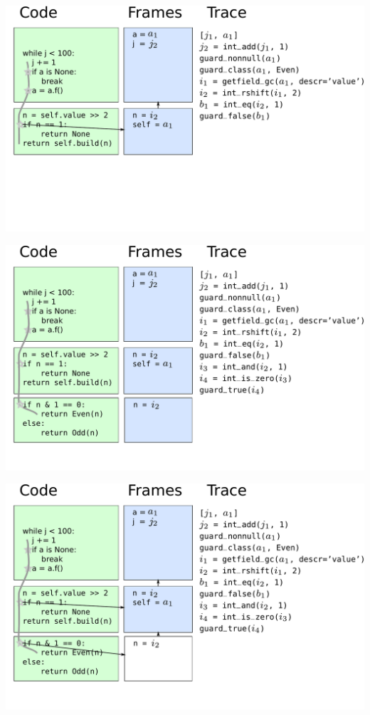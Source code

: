 \documentclass[utf8x]{beamer}
\begin{document}
\begin{frame}
  \includegraphics[scale=0.4]{figures/framechain1}
\end{frame}

\begin{frame}
  \includegraphics[scale=0.4]{figures/loop08}
\end{frame}

\begin{frame}
  \includegraphics[scale=0.4]{figures/framechain2}
\end{frame}
\end{document}
